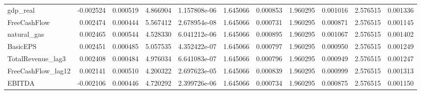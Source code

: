 \documentclass[12pt,a4paper,english]{article}
\begin{document}
{{\begin{tabular}{@{}lrrrrrrrrrr@{}}
			gdp\_real                     & -0.002524                & 0.000519                    & 4.866904                  & 1.157808e-06                             & 1.645066                      & 0.000853                      & 1.960295                     & 0.001016                     & 2.576515                     & 0.001336                     \\
			FreeCashFlow                  & 0.002474                 & 0.000444                    & 5.567412                  & 2.678954e-08                             & 1.645066                      & 0.000731                      & 1.960295                     & 0.000871                     & 2.576515                     & 0.001145                     \\
			natural\_gas                  & 0.002465                 & 0.000544                    & 4.528330                  & 6.041212e-06                             & 1.645066                      & 0.000895                      & 1.960295                     & 0.001067                     & 2.576515                     & 0.001402                     \\
			BasicEPS                      & 0.002451                 & 0.000485                    & 5.057535                  & 4.352422e-07                             & 1.645066                      & 0.000797                      & 1.960295                     & 0.000950                     & 2.576515                     & 0.001249                     \\
			TotalRevenue\_lag3            & 0.002408                 & 0.000484                    & 4.976034                  & 6.641083e-07                             & 1.645066                      & 0.000796                      & 1.960295                     & 0.000949                     & 2.576515                     & 0.001247                     \\
			FreeCashFlow\_lag12           & 0.002141                 & 0.000510                    & 4.200322                  & 2.697623e-05                             & 1.645066                      & 0.000839                      & 1.960295                     & 0.000999                     & 2.576515                     & 0.001313                     \\
			EBITDA                        & -0.002106                & 0.000446                    & 4.720292                  & 2.399726e-06                             & 1.645066                      & 0.000734                      & 1.960295                     & 0.000875                     & 2.576515                     & 0.001150                     \\

\end{tabular}}}
\end{document}
